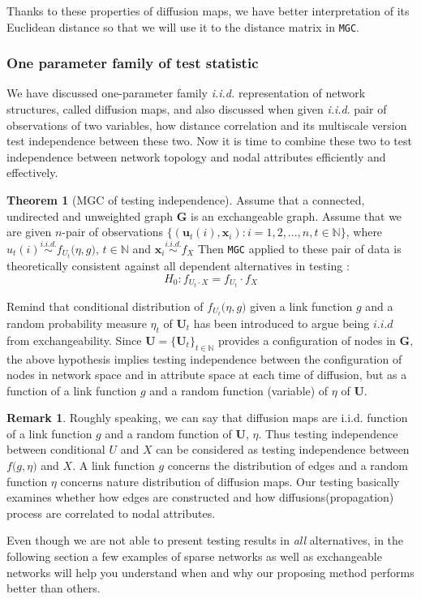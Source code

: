 \documentclass[12pt]{article}
\theoremstyle{definition}
\newtheorem{theorem}{Theorem}[section]
\newtheorem{remark}{Remark}
\begin{document}
Thanks to these properties of diffusion maps, we have better interpretation of its Euclidean distance so that we will use it to the distance matrix in \texttt{MGC}.
	
\subsubsection{One parameter family of test statistic}

We have discussed one-parameter family \textit{i.i.d.} representation of network structures, called diffusion maps, and also discussed when given \textit{i.i.d}. pair of observations of two variables, how distance correlation and its multiscale version test independence between these two. Now it is time to combine these two to test independence between network topology and nodal attributes efficiently and effectively.
	
\begin{theorem}[MGC of testing independence]
 \label{theorem1}
Assume that a connected, undirected and unweighted graph $\mathbf{G}$ is an exchangeable graph.  Assume that we are given $n$-pair of observations $\{ ( \mathbf{u}_{t}(i), \mathbf{x}_{i}): i = 1,2,... , n  , t \in \mathbb{N} \}$, where $u_{t}(i) \overset{i.i.d.}{\sim} f_{U_t} \big(  \eta, g \big)$, $t \in \mathbb{N}$ and $\mathbf{x}_{i} \overset{i.i.d.}{\sim} f_{X}$ Then \texttt{MGC} applied to these pair of data is theoretically consistent against all dependent alternatives in testing :
\begin{equation}
H_{0} : f_{U_t \cdot X} = f_{U_t} \cdot f_{X}
\end{equation}
\end{theorem}
Remind that  conditional distribution of $f_{U_t} \big( \eta, g \big)$ given a link function $g$ and a random probability measure $\eta_{t}$ of $\mathbf{U}_t$ has been introduced to argue being $\textit{i.i.d}$ from exchangeability. 	Since $\boldsymbol{U}  = \{ \boldsymbol{U}_{t} \}_{t \in \mathbb{N}}$ provides a configuration of nodes in $\boldsymbol{G},$ the above hypothesis implies testing independence between the configuration of nodes in network space and in attribute space at each time of diffusion, but as a function of a link function $g$ and a random function (variable) of $\eta$ of $\mathbf{U}$.
	
\begin{remark}
	Roughly speaking, we can say that diffusion maps are i.i.d. function of a link function $g$ and a random function of $\mathbf{U}$, $\eta$. Thus testing independence between conditional $U$ and $X$ can be considered as testing independence between $f \big( g, \eta \big)$ and $X$. A link function $g$ concerns the distribution of edges and a random function $\eta$ concerns nature distribution of diffusion maps. Our testing basically examines whether how edges are constructed and how diffusions(propagation) process are correlated to nodal attributes.  
\end{remark}
Even though we are not able to present testing results in \textit{all} alternatives, in the following section a few examples of sparse networks as well as exchangeable networks will help you understand when and why our proposing method performs better than others. 
\end{document}
